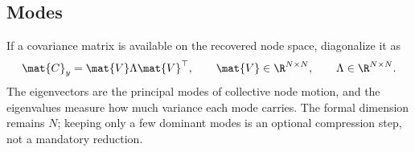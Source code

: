 \subsection{Modes}
\label{subsec:modes}

If a covariance matrix is available on the recovered node space, diagonalize it
as
\[
  \mat{C}_y = \mat{V}\Lambda\mat{V}^{\top},
  \qquad
  \mat{V} \in \R^{N \times N},
  \qquad
  \Lambda \in \R^{N \times N}.
\]
The eigenvectors are the principal modes of collective node motion, and the
eigenvalues measure how much variance each mode carries.  The formal dimension
remains $N$; keeping only a few dominant modes is an optional compression step,
not a mandatory reduction.
